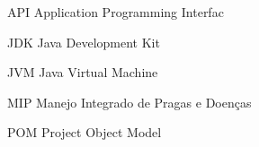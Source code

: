 
\begin{siglas}

    
    \item[API] Application Programming Interfac
    
    
    \item[JDK] Java Development Kit 
    
    \item[JVM] Java Virtual Machine
    
    \item[MIP] Manejo Integrado de Pragas e Doenças
    
    \item[POM] Project Object Model
    
    
    
    
\end{siglas}


